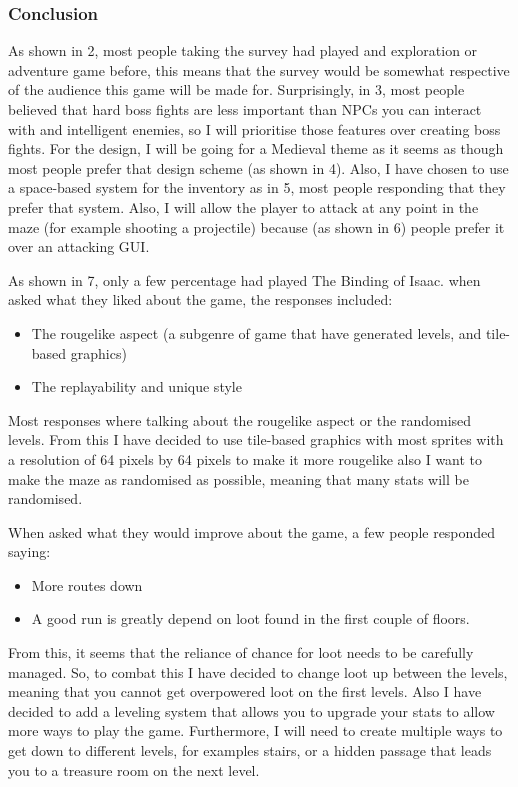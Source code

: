 \documentclass{article}
\begin{document}
        \subsubsection{Conclusion}
            As shown in \figurename{ 2}, most people taking the survey had played and exploration or adventure game before, this means that the survey would be somewhat respective of the audience this game will be made for. Surprisingly, in \figurename{ 3}, most people believed that hard boss fights are less important than NPCs you can interact with and intelligent enemies, so I will prioritise those features over creating boss fights. For the design, I will be going for a Medieval theme as it seems as though most people prefer that design scheme (as shown in \figurename{ 4}). Also, I have chosen to use a space-based system for the inventory as in \figurename{ 5}, most people responding that they prefer that system. Also, I will allow the player to attack at any point in the maze (for example shooting a projectile) because (as shown in \figurename{ 6}) people prefer it over an attacking GUI.

            As shown in \figurename{ 7}, only a few percentage had played The Binding of Isaac. when asked what they liked about the game, the responses included:
            \begin{itemize}
                \item The rougelike aspect (a subgenre of game that have generated levels, and tile-based graphics)
                \item The replayability and unique style
            \end{itemize}
            Most responses where talking about the rougelike aspect or the randomised levels. From this I have decided to use tile-based graphics with most sprites with a resolution of 64 pixels by 64 pixels to make it more rougelike also I want to make the maze as randomised as possible, meaning that many stats will be randomised.

            When asked what they would improve about the game, a few people responded saying:
            \begin{itemize}
                \item More routes down
                \item A good run is greatly depend on loot found in the first couple of floors.
            \end{itemize}
            From this, it seems that the reliance of chance for loot needs to be carefully managed. So, to combat this I have decided to change loot up between the levels, meaning that you cannot get overpowered loot on the first levels. Also I have decided to add a leveling system that allows you to upgrade your stats to allow more ways to play the game. Furthermore, I will need to create multiple ways to get down to different levels, for examples stairs, or a hidden passage that leads you to a treasure room on the next level.
        \clearpage
\end{document}

